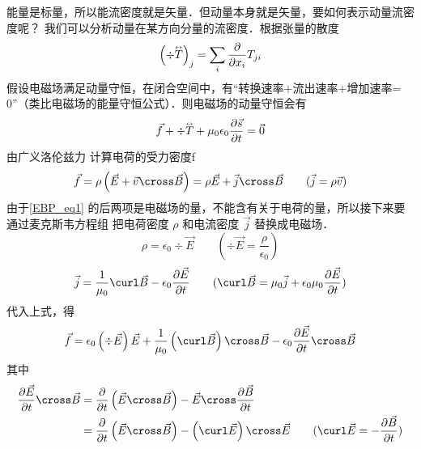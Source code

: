 能量是标量，所以能流密度就是矢量．但动量本身就是矢量，要如何表示动量流密度呢？ 
我们可以分析动量在某方向分量的流密度．根据张量的散度%
\begin{equation}
{\left( {\div \mathord{\buildrel{\lower3pt\hbox{$\scriptscriptstyle\leftrightarrow$}} 
\over T} } \right)_j} = \sum\limits_i {\frac{\partial }{{\partial {x_i}}}{T_{ji}}}
\end{equation}
假设电磁场满足动量守恒，在闭合空间中，有“转换速率+流出速率+增加速率= 0”（类比电磁场的能量守恒公式）．则电磁场的动量守恒会有
\begin{equation}\label{EBP_eq1}
\vec f + \div \mathord{\buildrel{\lower3pt\hbox{$\scriptscriptstyle\leftrightarrow$}} 
\over T}  + {\mu _0}{\epsilon_0}\frac{{\partial \vec s}}{{\partial t}} = \vec 0
\end{equation} 
由广义洛伦兹力%
计算电荷的受力密度\vec f %
\begin{equation}
\vec f = \rho \left( {\vec E + \vec v \cross \vec B} \right) = \rho \vec E + \vec j \cross \vec B
\qquad
(\vec j = \rho \vec v)
\end{equation} 
由于\autoref{EBP_eq1} 的后两项是电磁场的量，不能含有关于电荷的量，所以接下来要通过麦克斯韦方程组 %
把电荷密度 $\rho$ 和电流密度 $\vec j$ 替换成电磁场．
\begin{equation}
\rho  = {\epsilon_0}\div \vec E
\qquad
(\div \vec E = \frac{\rho }{{{\epsilon_0}}})
\end{equation}
\begin{equation}
\vec j = \frac{1}{{{\mu _0}}}\curl \vec B - {\epsilon_0}\frac{{\partial \vec E}}{{\partial t}}
\qquad
(\curl \vec B = {\mu _0}\vec j + {\epsilon_0}{\mu _0}\frac{{\partial \vec E}}{{\partial t}})
\end{equation}
代入上式，得
\begin{equation}
\vec f = {\epsilon_0}\left( {\div \vec E} \right)\vec E + \frac{1}{{{\mu _0}}}\left( {\curl \vec B} \right) \cross \vec B - {\epsilon_0}\frac{{\partial \vec E}}{{\partial t}} \cross \vec B
\end{equation} 
其中 
\begin{equation}
\begin{aligned}
\frac{{\partial \vec E}}{{\partial t}} \cross \vec B &= \frac{\partial }{{\partial t}}\left( {\vec E \cross \vec B} \right) - \vec E \cross \frac{{\partial \vec B}}{{\partial t}}\\ 
&= \frac{\partial }{{\partial t}}\left( {\vec E \cross \vec B} \right) - \left( {\curl \vec E} \right) \cross \vec E
\qquad
(\curl \vec E =  - \frac{{\partial \vec B}}{{\partial t}})
\end{aligned}
\end{equation} 
